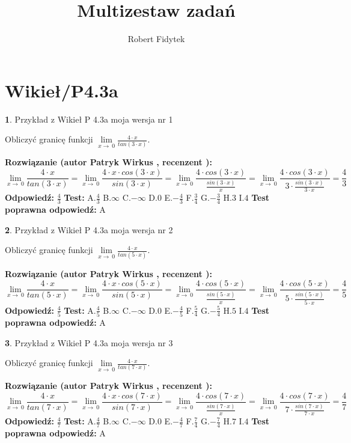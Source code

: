 \documentclass[12pt, a4paper]{article}
\title{Multizestaw zadań}
\author{Robert Fidytek}
\date{}
\theoremstyle{definition} %
\newtheorem{zad}{}
\newcommand{\kategoria}[1]{\section{#1}}
\newcommand{\zadStart}[1]{\begin{zad}#1\newline}
\newcommand{\zadStop}{\end{zad}}
\newcommand{\rozwStart}[2]{\noindent \textbf{Rozwiązanie (autor #1 , recenzent #2): }\newline}
\newcommand{\rozwStop}{\newline}
\newcommand{\odpStart}{\noindent \textbf{Odpowiedź:}\newline}
\newcommand{\odpStop}{\newline}
\newcommand{\testStart}{\noindent \textbf{Test:}\newline}
\newcommand{\testStop}{\newline}
\newcommand{\kluczStart}{\noindent \textbf{Test poprawna odpowiedź:}\newline}
\newcommand{\kluczStop}{\newline}
\begin{document}
\maketitle

\kategoria{Wikieł/P4.3a}


\zadStart{Przykład z Wikieł P 4.3a moja wersja nr 1}


Obliczyć granicę funkcji $\lim\limits_{x\to\ 0}\frac{4 \cdot x}{tan(3 \cdot x)}$.
\zadStop
\rozwStart{Patryk Wirkus}{}
$$\lim\limits_{x\to\ 0}\frac{4 \cdot x}{tan(3 \cdot x)}=\lim\limits_{x\to\ 0}\frac{4 \cdot x \cdot cos(3 \cdot x)}{sin(3 \cdot x)}=\lim\limits_{x\to\ 0}\frac{4 \cdot cos(3 \cdot x)}{\frac{sin(3 \cdot x)}{x}}=\lim\limits_{x\to\ 0}\frac{4 \cdot cos(3 \cdot x)}{3 \cdot \frac{sin(3 \cdot x)}{3 \cdot x}} = \frac{4}{3}$$
\rozwStop
\odpStart
$\frac{4}{3}$
\odpStop
\testStart
A.$\frac{4}{3}$
B.$\infty$
C.$-\infty$
D.$0$
E.$-\frac{4}{3}$
F.$\frac{3}{4}$
G.$-\frac{3}{4}$
H.$3$
I.$4$
\testStop
\kluczStart
A
\kluczStop



\zadStart{Przykład z Wikieł P 4.3a moja wersja nr 2}


Obliczyć granicę funkcji $\lim\limits_{x\to\ 0}\frac{4 \cdot x}{tan(5 \cdot x)}$.
\zadStop
\rozwStart{Patryk Wirkus}{}
$$\lim\limits_{x\to\ 0}\frac{4 \cdot x}{tan(5 \cdot x)}=\lim\limits_{x\to\ 0}\frac{4 \cdot x \cdot cos(5 \cdot x)}{sin(5 \cdot x)}=\lim\limits_{x\to\ 0}\frac{4 \cdot cos(5 \cdot x)}{\frac{sin(5 \cdot x)}{x}}=\lim\limits_{x\to\ 0}\frac{4 \cdot cos(5 \cdot x)}{5 \cdot \frac{sin(5 \cdot x)}{5 \cdot x}} = \frac{4}{5}$$
\rozwStop
\odpStart
$\frac{4}{5}$
\odpStop
\testStart
A.$\frac{4}{5}$
B.$\infty$
C.$-\infty$
D.$0$
E.$-\frac{4}{5}$
F.$\frac{5}{4}$
G.$-\frac{5}{4}$
H.$5$
I.$4$
\testStop
\kluczStart
A
\kluczStop



\zadStart{Przykład z Wikieł P 4.3a moja wersja nr 3}


Obliczyć granicę funkcji $\lim\limits_{x\to\ 0}\frac{4 \cdot x}{tan(7 \cdot x)}$.
\zadStop
\rozwStart{Patryk Wirkus}{}
$$\lim\limits_{x\to\ 0}\frac{4 \cdot x}{tan(7 \cdot x)}=\lim\limits_{x\to\ 0}\frac{4 \cdot x \cdot cos(7 \cdot x)}{sin(7 \cdot x)}=\lim\limits_{x\to\ 0}\frac{4 \cdot cos(7 \cdot x)}{\frac{sin(7 \cdot x)}{x}}=\lim\limits_{x\to\ 0}\frac{4 \cdot cos(7 \cdot x)}{7 \cdot \frac{sin(7 \cdot x)}{7 \cdot x}} = \frac{4}{7}$$
\rozwStop
\odpStart
$\frac{4}{7}$
\odpStop
\testStart
A.$\frac{4}{7}$
B.$\infty$
C.$-\infty$
D.$0$
E.$-\frac{4}{7}$
F.$\frac{7}{4}$
G.$-\frac{7}{4}$
H.$7$
I.$4$
\testStop
\kluczStart
A
\kluczStop
\end{document}
